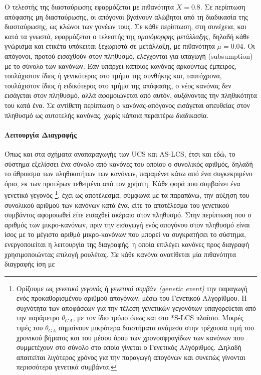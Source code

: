 Ο τελεστής της διασταύρωσης εφαρμόζεται με πιθανότητα $X = 0.8$. Σε περίπτωση απόφασης μη διασταύρωσης, οι απόγονοι βγαίνουν αλώβητοι από τη διαδικασία της διασταύρωσης, ως κλώνοι των γονέων τους. Σε κάθε περίπτωση, στη συνέχεια, και κατά τα γνωστά, εφαρμόζεται ο τελεστής της \emph{ομοιόμορφης μετάλλαξης}, δηλαδή κάθε γνώρισμα και ετικέτα υπόκειται ξεχωριστά σε μετάλλαξη, με πιθανότητα $\mu = 0.04$. Οι απόγονοι, προτού εισαχθούν στον πληθυσμό, ελέγχονται για υπαγωγή (subsumption) με το σύνολο των κανόνων. Εάν υπάρχει κάποιος κανόνας αρκούντως έμπειρος, τουλάχιστον ίδιος ή γενικότερος στο τμήμα της συνθήκης και, ταυτόχρονα, τουλάχιστον ίδιος ή ειδικότερος στο τμήμα της απόφασης, ο νέος κανόνας δεν εισάγεται στον πληθυσμό, αλλά αφομοιώνεται από αυτόν, αυξάνοντας την πληθικότητα του κατά ένα. Σε αντίθετη περίπτωση ο κανόνας-απόγονος εισάγεται απευθείας στον πληθυσμό ως αυτοτελής κανόνας, χωρίς κάποια περαιτέρω διαδικασία.
\\

\paragraph{Λειτουργία Διαγραφής}
Όπως και στα σχήματα αναπαραγωγής των UCS και AS-LCS, έτσι και εδώ, το σύστημα εξελίσσει ένα σύνολο από κανόνες του οποίου ο συνολικός αριθμός, δηλαδή το άθροισμα των πληθικοτήτων των κανόνων, παραμένει κάτω από ένα συγκεκριμένο όριο, εκ των προτέρων τεθειμένο από τον χρήστη. Κάθε φορά που συμβαίνει ένα γενετικό γεγονός
\footnote{Ορίζουμε ως \emph{γενετικό γεγονός} ή \emph{γενετικό συμβάν (genetic event)} την παραγωγή ενός προκαθορισμένου αριθμού απογόνων, μέσω του Γενετικού Αλγορίθμου. Η συχνότητα των αποφάσεων για την τέλεση γενετικών γεγονότων υπαγορεύεται από την παράμετρο $\theta_{GA}$, με τον ίδιο τρόπο όπως και στο *S-LCS πλαίσιο. Μικρές τιμές του $\theta_{GA}$ σημαίνουν μικρότερα διαστήματα ανάμεσα στην τρέχουσα τιμή του χρονικού βήματος και του μέσου όρου των χρονοσφραγίδων των κανόνων που συμμετέχουν στο σύνολο στο οποίο γίνεται ο Γενετικός Αλγόριθμος. Δηλαδή απαιτείται λιγότερος χρόνος για την παραγωγή απογόνων και συνεπώς γίνονται περισσότερα γενετικά συμβάντα.}, 
έχει ως αποτέλεσμα, σύμφωνα με τα παραπάνω, την αύξηση του συνολικού αριθμού των κανόνων κατά ένα, είτε το αποτέλεσμα του γενετικού συμβάντος αφομοιωθεί είτε εισαχθεί ακέραιο στον πληθυσμό. Στην περίπτωση που ο αριθμός των μικρο-κανόνων, πριν την εισαγωγή ενός απογόνου στον πληθυσμό είναι ίσος με το μέγιστο αριθμό μικρο-κανόνων που μπορεί να συγκρατήσει το σύστημα, ενεργοποιείται η λειτουργία της διαγραφής, η οποία επιλέγει κανόνες προς διαγραφή χρησιμοποιώντας επιλογή ρουλέτας. Σε κάθε κανόνα ανατίθεται μία πιθανότητα διαγραφής ίση με 


